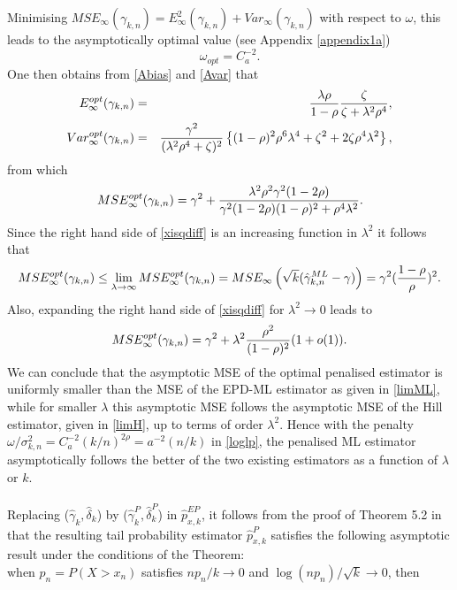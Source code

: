 \vspace{0.3cm}\noindent
Minimising $MSE_{\infty}(\gamma_{k,n})= E^2_{\infty} (\gamma_{k,n})
+ Var_{\infty} (\gamma_{k,n})$ 
with respect to $\omega$, this leads to the asymptotically optimal value (see Appendix \ref{appendix1a}) $$\omega_{opt}= C_a^{-2}.$$ 
One then obtains from \eqref{Abias} and \eqref{Avar} that 
\begin{eqnarray*}
	E^{opt}_{\infty} (\gamma_{k,n}) &=& {\lambda \rho\over 1-\rho}
	{\zeta \over \zeta + \lambda^2 \rho^4 },\\
	Var^{opt}_{\infty} (\gamma_{k,n}) &=& {\gamma^2 \over (\lambda^2\rho^4+ \zeta)^2}
	\left\{(1-\rho)^2\rho^6 \lambda^4 + \zeta^2 + 2\zeta \rho^4\lambda^2 \right\},
\end{eqnarray*}
from which 
\begin{equation}
MSE^{opt}_{\infty}(\gamma_{k,n}) =
\gamma^2 + { \lambda^2 \rho^2 \gamma^2 (1-2\rho) \over \gamma^2 (1-2\rho)(1-\rho)^2 + \rho^4 \lambda^2}.
\label{xisqdiff}
\end{equation}
Since the right hand side of \eqref{xisqdiff} is an increasing function in $\lambda^2$ it follows that
$$
MSE^{opt}_{\infty}(\gamma_{k,n}) \leq \lim_{\lambda \to \infty}MSE^{opt}_{\infty}(\gamma_{k,n}) = MSE_{\infty}\left(\sqrt{k}(\hat{\gamma}_{k,n}^{ML}-\gamma)\right)= \gamma^2 ({1-\rho \over \rho})^2.
$$ 
Also, expanding the right hand side of \eqref{xisqdiff} for $\lambda^2 \to 0$ leads to 
$$
MSE^{opt}_{\infty}(\gamma_{k,n}) = \gamma^2 + \lambda^2 {\rho^2 \over (1-\rho)^2}(1+o(1)).
$$
We can conclude that the asymptotic MSE of the optimal penalised estimator is uniformly smaller than the MSE of the EPD-ML estimator as given in \eqref{limML}, while for smaller $\lambda$ this asymptotic MSE follows the asymptotic MSE of the Hill estimator, given in \eqref{limH}, up to terms of order $\lambda^2$. Hence with the penalty $\omega /\sigma^2_{k,n}= C_a^{-2}(k/n)^{2 \rho}= a^{-2}(n/k)$ in \eqref{loglp}, the penalised ML estimator asymptotically follows the better of the two existing estimators as a function of $\lambda$ or $k$.
\\\\
Replacing ($\hat\gamma _k,\hat\delta _k$) by ($\hat\gamma ^{P}_k,\hat\delta ^{P}_k$) in $\hat{p}^{EP}_{x,k}$, it follows from the proof of Theorem 5.2 in \cite{beirlant2009second} that the resulting tail probability estimator $\hat{p}^{P}_{x,k}$ satisfies the following asymptotic result under the conditions of the Theorem: \\
when $p_n = P(X>x_n)$ satisfies $np_n/k \to 0$ and $\log(np_n)/\sqrt{k} \to 0$, then 

